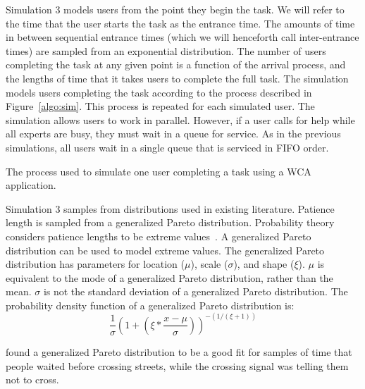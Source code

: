 Simulation 3 models users from the point they begin the task.
We will refer to the time that the user starts the task as the entrance time.
The amounts of time in between sequential entrance times (which we will
henceforth call inter-entrance times) are sampled from an exponential
distribution.
The number of users completing the task at any given point is a function of the
arrival process, and the lengths of time that it takes users to complete the
full task.
The simulation models users completing the task according to the process
described in Figure~\ref{algo:sim}.
This process is repeated for each simulated user.
The simulation allows users to work in parallel.
However, if a user calls for help while all experts are busy, they must wait in
a queue for service.
As in the previous simulations, all users wait in a single queue that is
serviced in FIFO order.

\begin{algorithm}[H]
  \caption{
    The process used to simulate one user completing a task using a WCA
    application.
  }\label{algo:sim}
\end{algorithm}

Simulation 3 samples from distributions used in existing literature.
Patience length is sampled from a generalized Pareto distribution.
Probability theory considers patience lengths to be extreme
values~\cite{patience}.
A generalized Pareto distribution can be used to model extreme values.
The generalized Pareto distribution has parameters for location ($\mu$), scale
($\sigma$), and shape ($\xi$).
$\mu$ is equivalent to the mode of a generalized Pareto distribution, rather than
the mean.
$\sigma$ is not the standard deviation of a generalized Pareto distribution.
The probability density function of a generalized Pareto distribution is:
\[
  \frac{1}{\sigma} \left(1 + \left(\xi * \frac{x - \mu}{\sigma}\right)
  \right)^{-(1/(\xi + 1))}
\]


\citet{patience} found a generalized Pareto distribution to be a good fit for
samples of time that people waited before crossing streets, while the crossing
signal was telling them not to cross.


